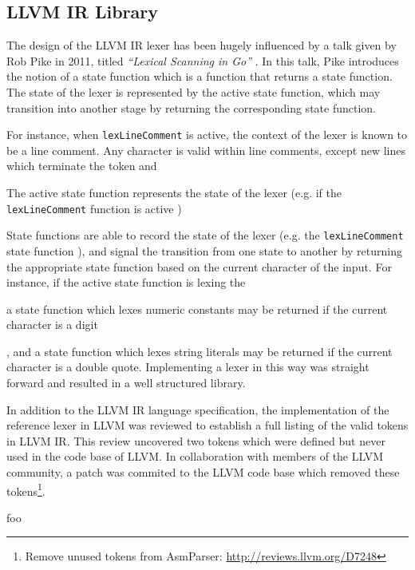 
\subsection{LLVM IR Library}
\label{sec:impl_llvm_ir_library}


The design of the LLVM IR lexer has been hugely influenced by a talk given by Rob Pike in 2011, titled \textit{``Lexical Scanning in Go''} \cite{lexical_scanning_in_go}. In this talk, Pike introduces the notion of a state function which is a function that returns a state function. The state of the lexer is represented by the active state function, which may transition into another stage by returning the corresponding state function.

For instance, when \texttt{lexLineComment} is active, the context of the lexer is known to be a line comment. Any character is valid within line comments, except new lines which terminate the token and

The active state function represents the state of the lexer (e.g. if the \texttt{lexLineComment} function is active )

State functions are able to record the state of the lexer (e.g. the \texttt{lexLineComment} state function ), and signal the transition from one state to another by returning the appropriate state function based on the current character of the input. For instance, if the active state function is lexing the

a state function which lexes numeric constants may be returned if the current character is a digit

, and a state function which lexes string literals may be returned if the current character is a double quote. Implementing a lexer in this way was straight forward and resulted in a well structured library.

In addition to the LLVM IR language specification, the implementation of the reference lexer in LLVM was reviewed to establish a full listing of the valid tokens in LLVM IR. This review uncovered two tokens which were defined but never used in the code base of LLVM. In collaboration with members of the LLVM community, a patch was commited to the LLVM code base which removed these tokens\footnote{Remove unused tokens from AsmParser: \url{http://reviews.llvm.org/D7248}}.



%

foo
